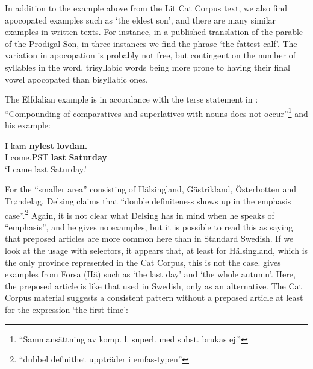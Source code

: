 {%
In addition to the example above from the Lit Cat Corpus text, we also find apocopated examples such as  ‘the eldest son’, and there are many similar examples in written texts. For instance, in a published translation of the parable of the Prodigal Son, in three instances we find the phrase  ‘the fattest calf’. The variation in apocopation is probably not free, but contingent on the number of syllables in the word, trisyllabic words being more prone to having their final vowel apocopated than bisyllabic ones. 


The Elfdalian example is in accordance with the terse statement in \citet[57]{Levander1909}: “Compounding of comparatives and superlatives with nouns does not occur”\footnote{ “Sammansättning av komp. l. superl. med subst. brukas ej.”} and his example:


\ea\label{}
\gll I  kam  \textbf{nylest} \textbf{lovdan.}\\
I  come.PST  \textbf{last} \textbf{Saturday}\\
\glt ‘I came last Saturday.’
\z

For the “smaller area” consisting of Hälsingland, Gästrikland, Österbotten and Trøndelag, Delsing claims that “double definiteness shows up in the emphasis case”.\footnote{ “dubbel definithet uppträder i emfas-typen” } Again, it is not clear what Delsing has in mind when he speaks of “emphasis”, and he gives no examples, but it is possible to read this as saying that preposed articles are more common here than in Standard Swedish. If we look at the usage with selectors, it appears that, at least for Hälsingland, which is the only province represented in the Cat Corpus, this is not the case. \citet[31]{Franck1995} gives examples from Forsa (Hä) such as  ‘the last day’ and  ‘the whole autumn’.  Here, the preposed article is like that used in Swedish, only as an alternative. The Cat Corpus material suggests a consistent pattern without a preposed article at least for the expression ‘the first time’:

}
